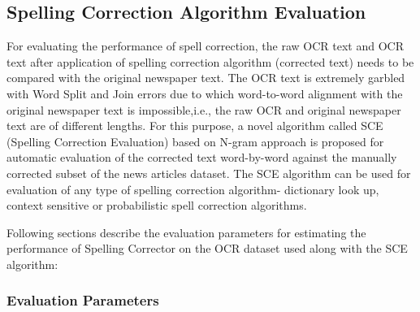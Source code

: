 \documentclass[12pt]{article}
\begin{document}
\subsection{Spelling Correction Algorithm Evaluation}
\label{spell:sce}

For evaluating the performance of spell correction, the raw OCR text and OCR text after application of spelling correction algorithm (corrected text) needs to be compared with the original newspaper text. The OCR text is extremely garbled with Word Split and Join errors due to which word-to-word alignment with the original newspaper text is impossible,i.e., the raw OCR and original newspaper text are of different lengths. For this purpose, a novel algorithm called SCE (Spelling Correction Evaluation) based on N-gram approach is proposed for automatic evaluation of the corrected text word-by-word against the manually corrected subset of the news articles dataset. The SCE algorithm can be used for evaluation of any type of spelling correction algorithm- dictionary look up, context sensitive or probabilistic spell correction algorithms.

Following sections describe the evaluation parameters for estimating the performance of Spelling Corrector on the OCR dataset used along with the SCE algorithm:

\subsubsection{Evaluation Parameters}
\end{document}
